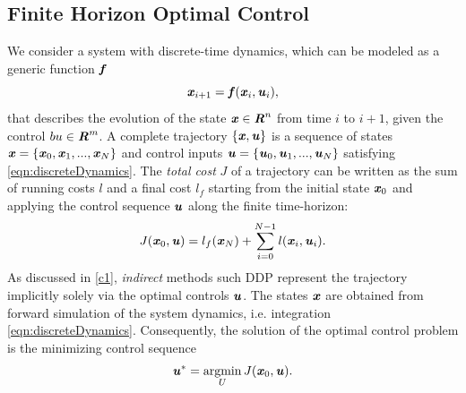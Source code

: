 \subsection{Finite Horizon Optimal Control}
We consider a system with discrete-time dynamics, which can be modeled as a generic function $\bm{\mathit{f}}$
\begin{equation}\label{eqn:discreteDynamics}
\bm{\mathit{x}}_{i+1}=\bm{\mathit{f}}(\bm{\mathit{x}}_i,\bm{\mathit{u}}_i), 
\end{equation}
that describes the evolution of the state $\bm{\mathit{x}}\in \bm{\mathit{R}}^n$ from time $i$ to $i+1$, given the control $bu\in \bm{\mathit{R}}^m$. A complete trajectory $\{\bm{\mathit{x}}, \bm{\mathit{u}}\}$ is a sequence of states $\bm{\mathit{x}}=\{\bm{\mathit{x}}_0, \bm{\mathit{x}}_1, ..., \bm{\mathit{x}}_N\}$ and control inputs $\bm{\mathit{u}}=\{\bm{\mathit{u}}_0, \bm{\mathit{u}}_1, ..., \bm{\mathit{u}}_N\}$ satisfying \cref{eqn:discreteDynamics}.
The \textit{total cost} $J$ of a trajectory can be written as the sum of running costs $l$ and a final cost $l_f$ starting from the initial state $\bm{\mathit{x}}_0$ and applying the control sequence $\bm{\mathit{u}}$ along the finite time-horizon:     
\begin{equation}\label{eqn:totalCost}
J(\bm{\mathit{x}}_0, \bm{\mathit{u}})=l_f(\bm{\mathit{x}}_N)+\sum_{i=0}^{N-1}l(\bm{\mathit{x}}_i,\bm{\mathit{u}}_i).
\end{equation}
As discussed in \cref{c1}, \textit{indirect} methods such \gls{DDP} represent the trajectory implicitly solely via the optimal controls $\bm{\mathit{u}}$. The states $\bm{\mathit{x}}$ are obtained from forward simulation of the system dynamics, i.e. integration \cref{eqn:discreteDynamics}. Consequently, the solution of the optimal control problem is the minimizing control sequence 
\begin{equation*}\label{eqn:minControl}
\bm{\mathit{u}}^*=\operatorname*{argmin}_U J(\bm{\mathit{x}}_0, \bm{\mathit{u}}). 
\end{equation*}

